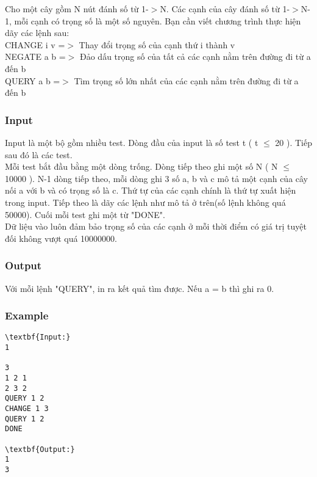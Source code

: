 



   Cho một cây gồm N nút đánh số từ 1-$>$N. Các cạnh của cây đánh số từ 1-$>$N-1, mỗi cạnh có trọng số là một số nguyên. Bạn cần viết chương trình thực hiện dãy các lệnh sau:   
\\   CHANGE i v =$>$ Thay đổi trọng số của cạnh thứ i thành v   
\\   NEGATE a b =$>$ Đảo dấu trọng số của tất cả các cạnh nằm trên đường đi từ a đến b   
\\   QUERY a b =$>$ Tìm trọng số lớn nhất của các cạnh nằm trên đường đi từ a đến b  

\subsubsection{   Input  }

   Input là một bộ gồm nhiều test. Dòng đầu của input là số test t ( t $\le$ 20 ). Tiếp sau đó là các test.   
\\   Mỗi test bắt đầu bằng một dòng trống. Dòng tiếp theo ghi một số N ( N $\le$ 10000 ). N-1 dòng tiếp theo, mỗi dòng ghi 3 số a, b và c mô tả một cạnh của cây nối a với b và có trọng số là c. Thứ tự của các cạnh chính là thứ tự xuất hiện trong input. Tiếp theo là dãy các lệnh như mô tả ở trên(số lệnh không quá 50000). Cuối mỗi test ghi một từ "DONE".   
\\   Dữ liệu vào luôn đảm bảo trọng số của các cạnh ở mỗi thời điểm có giá trị tuyệt đối không vượt quá 10000000.  

\subsubsection{   Output  }

   Với mỗi lệnh "QUERY", in ra kết quả tìm được. Nếu a = b  thì ghi ra 0.  

\subsubsection{   Example  }
\begin{verbatim}
\textbf{Input:}
1

3
1 2 1
2 3 2
QUERY 1 2
CHANGE 1 3
QUERY 1 2
DONE

\textbf{Output:}
1
3
\end{verbatim}
